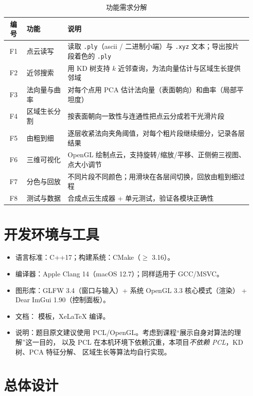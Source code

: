 \begin{table}[!htb]
  \centering
  \caption{功能需求分解}\label{tab:req}
  \begin{tabular}{@{}clp{7.2cm}@{}}
    \toprule
    编号 & 功能 & 说明 \\
    \midrule
    F1 & 点云读写 & 读取 \texttt{.ply}（ascii / 二进制小端）与 \texttt{.xyz} 文本；导出按片段着色的 \texttt{.ply} \\
    F2 & 近邻搜索 & 用 KD 树支持 $k$ 近邻查询，为法向量估计与区域生长提供邻域 \\
    F3 & 法向量与曲率 & 对每个点用 PCA 估计法向量（表面朝向）和曲率（局部平坦度） \\
    F4 & 区域生长分割 & 按表面朝向一致性与连通性把点云分成若干光滑片段 \\
    F5 & 由粗到细 & 逐层收紧法向夹角阈值，对每个粗片段继续细分，记录各层结果 \\
    F6 & 三维可视化 & OpenGL 绘制点云，支持旋转/缩放/平移、正侧俯三视图、点大小调节 \\
    F7 & 分色与回放 & 不同片段不同颜色；用滑块在各层间切换，回放由粗到细过程 \\
    F8 & 测试与数据 & 合成点云生成器 + 单元测试，验证各模块正确性 \\
    \bottomrule
  \end{tabular}
\end{table}

\section{开发环境与工具}

\begin{itemize}
  \item 语言标准：C++17；构建系统：CMake（$\ge$ 3.16）。
  \item 编译器：Apple Clang 14（macOS 12.7）；同样适用于 GCC/MSVC。
  \item 图形库：GLFW 3.4（窗口与输入）+ 系统 OpenGL 3.3 核心模式（渲染）
        + Dear ImGui 1.90（控制面板）。
  \item 文档：\nwafupaper{} 模板，Xe\LaTeX{} 编译。
  \item 说明：题目原文建议使用 PCL/OpenGL。考虑到课程“展示自身对算法的理解”这一目的，
        以及 PCL 在本机环境下依赖沉重，本项目\emph{不依赖 PCL}，KD 树、PCA 特征分解、
        区域生长等算法均自行实现。
\end{itemize}

\section{总体设计}


